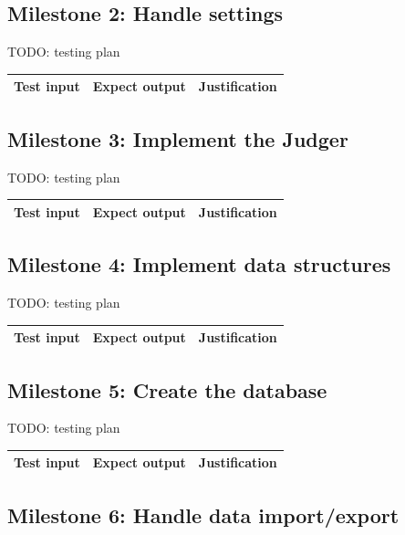 \documentclass[a4paper]{report}
\begin{document}
\subsection{Milestone 2: Handle settings}

TODO: testing plan

\begin{tabulary}{\textwidth}{|L|L|L|}
    \hline
    Test input & Expect output & Justification \\
    \hline
\end{tabulary}

\subsection{Milestone 3: Implement the Judger}

TODO: testing plan

\begin{tabulary}{\textwidth}{|L|L|L|}
    \hline
    Test input & Expect output & Justification \\
    \hline
\end{tabulary}

\subsection{Milestone 4: Implement data structures}

TODO: testing plan

\begin{tabulary}{\textwidth}{|L|L|L|}
    \hline
    Test input & Expect output & Justification \\
    \hline
\end{tabulary}

\subsection{Milestone 5: Create the database}

TODO: testing plan

\begin{tabulary}{\textwidth}{|L|L|L|}
    \hline
    Test input & Expect output & Justification \\
    \hline
\end{tabulary}

\subsection{Milestone 6: Handle data import/export}
\end{document}
